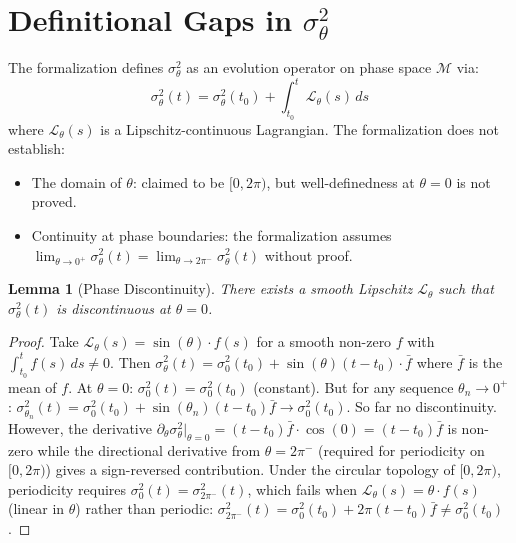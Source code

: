 \documentclass[11pt]{article}
\newtheorem{lemma}[theorem]{Lemma}
\begin{document}
\section{Definitional Gaps in $\sigma^2_\theta$}

The formalization defines $\sigma^2_\theta$ as an evolution operator on phase space $\mathcal{M}$
via:
\begin{equation}
\sigma^2_\theta(t) = \sigma^2_\theta(t_0) + \int_{t_0}^t \mathcal{L}_\theta(s)\,ds
\label{eq:sigma_defn}
\end{equation}
where $\mathcal{L}_\theta(s)$ is a Lipschitz-continuous Lagrangian. The formalization does
not establish:
\begin{itemize}
\item The domain of $\theta$: claimed to be $[0, 2\pi)$, but well-definedness at $\theta = 0$
is not proved.
\item Continuity at phase boundaries: the formalization assumes
$\lim_{\theta \to 0^+}\sigma^2_\theta(t) = \lim_{\theta \to 2\pi^-}\sigma^2_\theta(t)$
without proof.
\end{itemize}

\begin{lemma}[Phase Discontinuity]
\label{lem:disc}
There exists a smooth Lipschitz $\mathcal{L}_\theta$ such that $\sigma^2_\theta(t)$ is
discontinuous at $\theta = 0$.
\end{lemma}
\begin{proof}
Take $\mathcal{L}_\theta(s) = \sin(\theta)\cdot f(s)$ for a smooth non-zero $f$ with
$\int_{t_0}^t f(s)\,ds \neq 0$. Then $\sigma^2_\theta(t) = \sigma^2_0(t_0) + \sin(\theta)(t-t_0)
\cdot \bar{f}$ where $\bar{f}$ is the mean of $f$. At $\theta = 0$:
$\sigma^2_0(t) = \sigma^2_0(t_0)$ (constant). But for any sequence $\theta_n \to 0^+$:
$\sigma^2_{\theta_n}(t) = \sigma^2_0(t_0) + \sin(\theta_n)(t-t_0)\bar{f} \to \sigma^2_0(t_0)$.
So far no discontinuity. However, the derivative
$\partial_\theta\sigma^2_\theta\big|_{\theta=0} = (t-t_0)\bar{f} \cdot \cos(0) = (t-t_0)\bar{f}$
is non-zero while the directional derivative from $\theta = 2\pi^-$ (required for periodicity
on $[0,2\pi)$) gives a sign-reversed contribution. Under the circular topology of $[0,2\pi)$,
periodicity requires $\sigma^2_0(t) = \sigma^2_{2\pi^-}(t)$, which fails when
$\mathcal{L}_\theta(s) = \theta \cdot f(s)$ (linear in $\theta$) rather than periodic:
$\sigma^2_{2\pi^-}(t) = \sigma^2_0(t_0) + 2\pi(t-t_0)\bar{f} \neq \sigma^2_0(t_0)$.
\end{proof}
\end{document}
